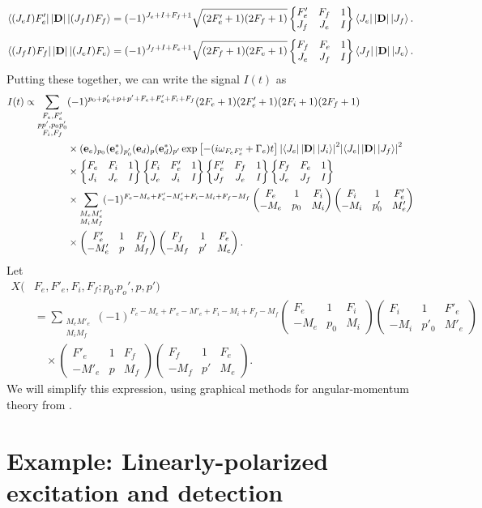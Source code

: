 \documentclass[11pt]{article}
\newcommand{\F}{\mathcal{F}}
\newcommand{\lb}{\left[}
\newcommand{\rb}{\right]}
\newcommand{\tj}[6]{ \begin{pmatrix}
		#1 & #2 & #3 \\
		#4 & #5 & #6 
\end{pmatrix}}
\newcommand{\Gj}[6]{ \begin{Bmatrix}
		#1 & #2 & #3 \\
		#4 & #5 & #6 
\end{Bmatrix}}
\begin{document}
\begin{align*}
\bra{(J_e I)F_e'}\abs{\mathbf{D}} \ket{(J_f I)F_f}
= (-1)^{J_e + I + F_f + 1}\sqrt{(2F'_e + 1)(2F_f+1)} 
\Gj{F'_e}{F_f}{1}{J_f}{J_e}{I}\bra{J_e}\abs{\mathbf{D}} \ket{J_f}.
\end{align*}
\begin{align*}
\bra{(J_f I)F_f} \abs{\mathbf{D}} \ket{(J_e I)F_e}
= (-1)^{J_f + I + F_e + 1}\sqrt{(2F_f + 1)(2F_e+1)} 
\Gj{F_f}{F_e}{1}{J_e}{J_f}{I}\bra{J_f}\abs{\mathbf{D}} \ket{J_e}.
\end{align*}
Putting these together, we can write the signal $I(t)$ as
\begin{align*}
I(t) 
\propto 
\sum_{\substack{F_e, F'_e\\pp', p_0p'_0\\F_i, F_f}}
&(-1)^{p_0 + p'_0 + p + p' + F_e + F_e' + F_i + F_f}(2F_e + 1)(2F'_e+1)(2F_i + 1)(2F_f+1)\\
& \times (\mathbf{e}_e)_{p_0}(\mathbf{e}^*_e)_{p_0'}(\mathbf{e}_d)_{p}(\mathbf{e}_d^*)_{p'} \exp\lb -(i\omega_{F_eF'_e} + \Gamma_e)t \rb\abs{\bra{J_e} \abs{\mathbf{D}}\ket{J_i}}^2\abs{ \bra{J_e} \abs{\mathbf{D}} \ket{J_f}}^2\\
&\times \Gj{F_e}{F_i}{1}{J_i}{J_e}{I}\Gj{F_i}{F'_e}{1}{J_e}{J_i}{I}\Gj{F'_e}{F_f}{1}{J_f}{J_e}{I}\Gj{F_f}{F_e}{1}{J_e}{J_f}{I}\\
&\times \sum_{\substack{M_eM'_e\\ M_i M_f}}(-1)^{F_e - M_e + F'_e - M'_e + F_i - M_i + F_f - M_f} \tj{F_e}{1}{F_i}{-M_e}{p_0}{M_i}\tj{F_i}{1}{F'_e}{-M_i}{p'_0}{M'_e}\\
&\times \tj{F'_e}{1}{F_f}{-M'_e}{p}{M_f}\tj{F_f}{1}{F_e}{-M_f}{p'}{M_e}.
\end{align*}
Let 
\begin{align*}
X(&F_e,F'_e,F_i,F_f;p_0.p_o',p,p') \\
&= \sum_{\substack{M_eM'_e\\ M_i M_f}}(-1)^{F_e - M_e + F'_e - M'_e + F_i - M_i + F_f - M_f} \tj{F_e}{1}{F_i}{-M_e}{p_0}{M_i}\tj{F_i}{1}{F'_e}{-M_i}{p'_0}{M'_e}\\ &\quad \times \tj{F'_e}{1}{F_f}{-M'_e}{p}{M_f}\tj{F_f}{1}{F_e}{-M_f}{p'}{M_e}.
\end{align*}
We will simplify this expression, using graphical methods for angular-momentum theory from \cite{angular_momentum}.


\section{Example: Linearly-polarized excitation and detection}
\end{document}
